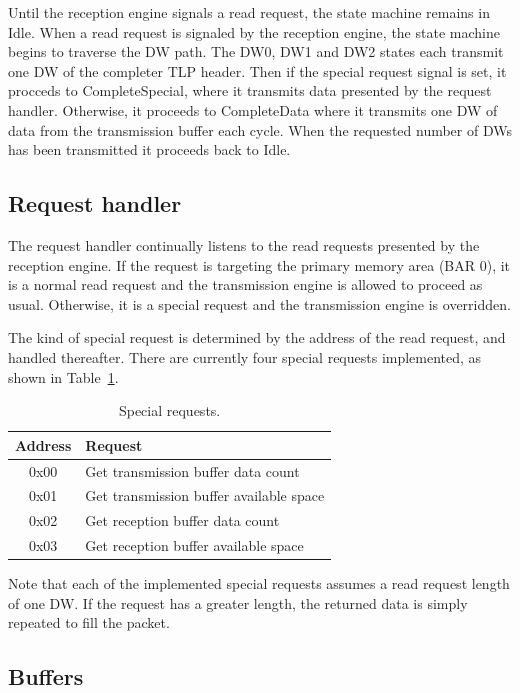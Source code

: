 Until the reception engine signals a read request, the state machine remains in Idle.
When a read request is signaled by the reception engine, the state machine begins to traverse the DW path.
The DW0, DW1 and DW2 states each transmit one DW of the completer TLP header.
Then if the special request signal is set, it procceds to CompleteSpecial, where it transmits data presented by the request handler.
Otherwise, it proceeds to CompleteData where it transmits one DW of data from the transmission buffer each cycle.
When the requested number of DWs has been transmitted it proceeds back to Idle.

\subsection{Request handler}

The request handler continually listens to the read requests presented by the reception engine.
If the request is targeting the primary memory area (BAR 0), it is a normal read request and the transmission engine is allowed to proceed as usual.
Otherwise, it is a special request and the transmission engine is overridden.

The kind of special request is determined by the address of the read request, and handled thereafter.
There are currently four special requests implemented, as shown in Table~\ref{tab:requests}.

\begin{table}[!ht]
    \renewcommand{\arraystretch}{1.3}
    \label{tab:requests}
    \centering
    \begin{tabular}{c|l}
        \bfseries Address & \bfseries Request \\
        \hline
        0x00 & Get transmission buffer data count \\
        0x01 & Get transmission buffer available space \\
        0x02 & Get reception buffer data count \\
        0x03 & Get reception buffer available space \\
    \end{tabular}
    \caption{Special requests.}
\end{table}

Note that each of the implemented special requests assumes a read request length of one DW.
If the request has a greater length, the returned data is simply repeated to fill the packet.

\subsection{Buffers}

